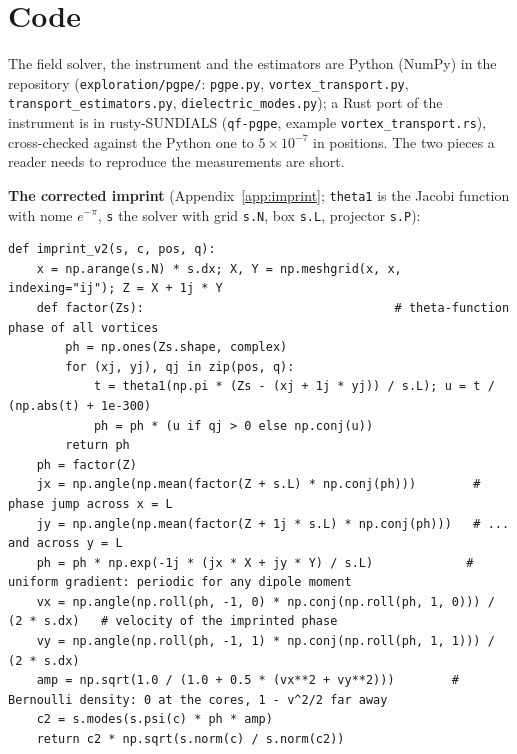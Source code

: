 \documentclass[11pt,a4paper]{article}
\begin{document}
\section{Code}\label{app:code}

The field solver, the instrument and the estimators are Python (NumPy) in the repository
(\texttt{exploration/pgpe/}: \texttt{pgpe.py}, \texttt{vortex\_transport.py}, \texttt{transport\_estimators.py},
\texttt{dielectric\_modes.py}); a Rust port of the instrument is in rusty-SUNDIALS (\texttt{qf-pgpe}, example
\texttt{vortex\_transport.rs}), cross-checked against the Python one to $5\times10^{-7}$ in positions. The two pieces a
reader needs to reproduce the measurements are short.

\noindent\textbf{The corrected imprint} (Appendix~\ref{app:imprint}; \texttt{theta1} is the Jacobi function with
nome $e^{-\pi}$, \texttt{s} the solver with grid \texttt{s.N}, box \texttt{s.L}, projector \texttt{s.P}):
\begin{lstlisting}
def imprint_v2(s, c, pos, q):
    x = np.arange(s.N) * s.dx; X, Y = np.meshgrid(x, x, indexing="ij"); Z = X + 1j * Y
    def factor(Zs):                                   # theta-function phase of all vortices
        ph = np.ones(Zs.shape, complex)
        for (xj, yj), qj in zip(pos, q):
            t = theta1(np.pi * (Zs - (xj + 1j * yj)) / s.L); u = t / (np.abs(t) + 1e-300)
            ph = ph * (u if qj > 0 else np.conj(u))
        return ph
    ph = factor(Z)
    jx = np.angle(np.mean(factor(Z + s.L) * np.conj(ph)))        # phase jump across x = L
    jy = np.angle(np.mean(factor(Z + 1j * s.L) * np.conj(ph)))   # ... and across y = L
    ph = ph * np.exp(-1j * (jx * X + jy * Y) / s.L)             # uniform gradient: periodic for any dipole moment
    vx = np.angle(np.roll(ph, -1, 0) * np.conj(np.roll(ph, 1, 0))) / (2 * s.dx)   # velocity of the imprinted phase
    vy = np.angle(np.roll(ph, -1, 1) * np.conj(np.roll(ph, 1, 1))) / (2 * s.dx)
    amp = np.sqrt(1.0 / (1.0 + 0.5 * (vx**2 + vy**2)))        # Bernoulli density: 0 at the cores, 1 - v^2/2 far away
    c2 = s.modes(s.psi(c) * ph * amp)
    return c2 * np.sqrt(s.norm(c) / s.norm(c2))
\end{lstlisting}
\end{document}
